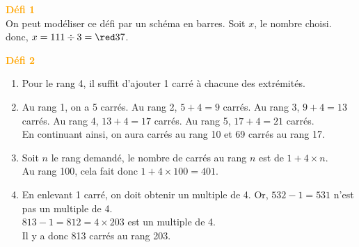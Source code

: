 \addtocounter{exercice}{-1}
\begin{corrige}
   \phantom{rrr}

   \hspace*{-7.5mm} \textcolor{orange}{\bf Défi 1} \\
   On peut modéliser ce défi par un schéma en barres. Soit $x$, le nombre choisi. \\
    donc, $x =111\div3 ={\red 37}$.
   
   \Coupe
   \hspace*{-7.5mm} \textcolor{orange}{\bf Défi 2} \\
   \begin{enumerate}
      \item Pour le rang 4, il suffit {\red d'ajouter 1 carré à chacune des extrémités}.
      \item Au rang 1, on a 5 carrés. Au rang 2, $5+4 =9$ carrés. Au rang 3, $9+4 =13$ carrés.  Au rang 4, $13+4 =17$ carrés. {\red Au rang 5, $17+4 =21$ carrés}. \\
         En continuant ainsi, on aura { carrés au rang 10 et 69 carrés au rang 17}.
         \item Soit $n$ le rang demandé, {\red le nombre de carrés au rang $n$ est de $1+4\times n$}. \\
            Au rang 100, cela fait donc $1+4\times100 =401$.
         \item En enlevant 1 carré, on doit obtenir un multiple de 4. Or, $532-1 =531$ n'est pas un multiple de 4. \\
            $813-1 =812 =4\times203$ est un multiple de 4. \\
            {\red Il y a donc 813 carrés au rang 203}.     
   \end{enumerate}
\end{corrige}
